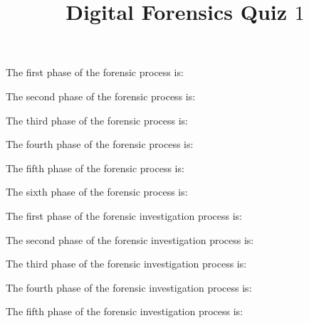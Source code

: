 \documentclass[theme=sleek, randomorder, hidesidemenu]{webquiz}
\title{Digital Forensics Quiz $1$}
\begin{document}
\begin{question}
  The first phase of the forensic process is:
\end{question}

\begin{question}
  The second phase of the forensic process is:
\end{question}

\begin{question}
  The third phase of the forensic process is:
\end{question}

\begin{question}
  The fourth phase of the forensic process is:
\end{question}

\begin{question}
  The fifth phase of the forensic process is:
\end{question}

\begin{question}
  The sixth phase of the forensic process is:
\end{question}

\begin{question}
  The first phase of the forensic investigation process is:
\end{question}

\begin{question}
  The second phase of the forensic investigation process is:
\end{question}

\begin{question}
  The third phase of the forensic investigation process is:
\end{question}

\begin{question}
  The fourth phase of the forensic investigation process is:
\end{question}

\begin{question}
  The fifth phase of the forensic investigation process is:
\end{question}
\end{document}
